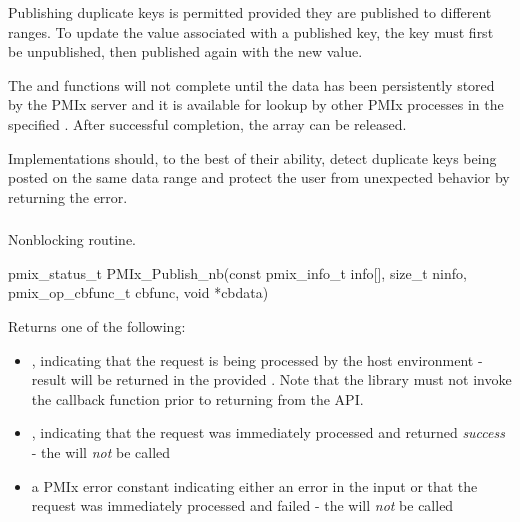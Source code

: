Publishing duplicate keys is permitted provided they are published to different ranges.
To update the value associated with a published key, the key must first be unpublished, then published again with the new value.

The  and  functions will not complete until the data has been persistently stored by the \ac{PMIx} server and it is available for lookup by other \ac{PMIx} processes in the specified .
After successful completion, the  array can be released.

\adviceimplstart
Implementations should, to the best of their ability, detect duplicate keys being posted on the same data range and protect the
user from unexpected behavior by returning the  error.
\adviceimplend

\subsubsection{}

\summary

Nonblocking  routine.

\format

\cspecificstart
\begin{codepar}
pmix_status_t
PMIx_Publish_nb(const pmix_info_t info[], size_t ninfo,
                pmix_op_cbfunc_t cbfunc, void *cbdata)
\end{codepar}
\cspecificend

\begin{arglist}
\end{arglist}

Returns one of the following:

\begin{itemize}
    \item {}, indicating that the request is being processed by the host environment - result will be returned in the provided . Note that the library must not invoke the callback function prior to returning from the \ac{API}.
    \item {}, indicating that the request was immediately processed and returned \textit{success} - the  will \textit{not} be called
    \item a PMIx error constant indicating either an error in the input or that the request was immediately processed and failed - the  will \textit{not} be called
\end{itemize}


